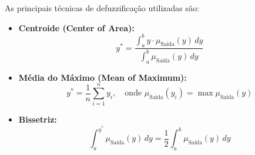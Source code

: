 As principais técnicas de defuzzificação utilizadas são:

\begin{itemize}
    \item \textbf{Centroide (Center of Area):}
    \begin{equation}
        y^* = \frac{\int_{a}^{b} y \cdot \mu_{\text{Saída}}(y) \, dy}{\int_{a}^{b} \mu_{\text{Saída}}(y) \, dy}
    \end{equation}
    \item \textbf{Média do Máximo (Mean of Maximum):}
    \begin{equation}
        y^* = \frac{1}{n} \sum_{i=1}^{n} y_i, \quad \text{onde } \mu_{\text{Saída}}(y_i) = \max \mu_{\text{Saída}}(y)
    \end{equation}
    \item \textbf{Bissetriz:}
    \begin{equation}
        \int_{a}^{y^*} \mu_{\text{Saída}}(y) \, dy = \frac{1}{2} \int_{a}^{b} \mu_{\text{Saída}}(y) \, dy
    \end{equation}
\end{itemize}
